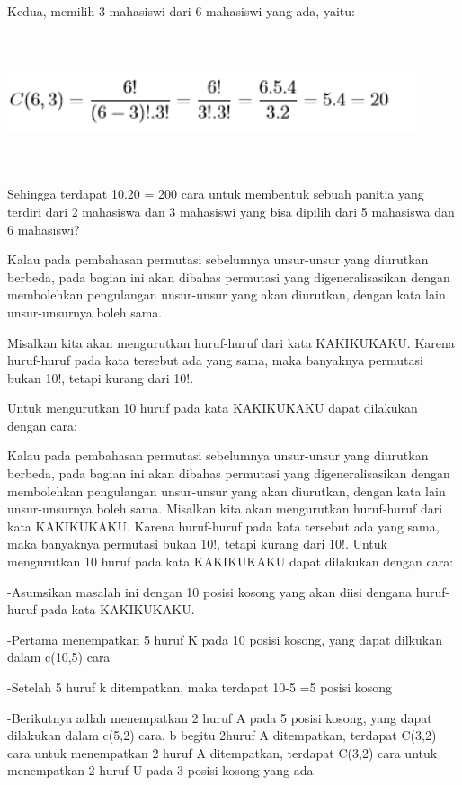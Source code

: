 \documentclass[11pt,fleqn]{book} %
\begin{document}
Kedua, memilih 3 mahasiswi dari 6 mahasiswi yang ada, yaitu:


\includegraphics[width = 12cm, height= 4cm]{Pictures/herlin11.png}

Sehingga terdapat 10.20 = 200 cara untuk membentuk sebuah panitia yang terdiri dari 2 mahasiswa dan 3 mahasiswi yang bisa dipilih dari 5 mahasiswa dan 6 mahasiswi?

Kalau pada pembahasan permutasi sebelumnya unsur-unsur yang diurutkan berbeda, pada bagian ini akan dibahas permutasi yang digeneralisasikan dengan membolehkan pengulangan unsur-unsur yang akan diurutkan, dengan kata lain unsur-unsurnya boleh sama.



Misalkan kita akan mengurutkan huruf-huruf dari kata KAKIKUKAKU. Karena huruf-huruf pada kata tersebut ada yang sama, maka banyaknya permutasi bukan 10!, tetapi kurang dari 10!.


Untuk mengurutkan 10 huruf pada kata KAKIKUKAKU dapat dilakukan dengan cara:

Kalau pada pembahasan permutasi sebelumnya unsur-unsur yang diurutkan berbeda, pada bagian ini akan dibahas permutasi yang digeneralisasikan dengan membolehkan pengulangan unsur-unsur yang akan diurutkan, dengan kata lain unsur-unsurnya boleh sama.
Misalkan kita akan mengurutkan huruf-huruf dari kata KAKIKUKAKU. Karena huruf-huruf pada kata tersebut ada yang sama, maka banyaknya permutasi bukan 10!, tetapi kurang dari 10!.
Untuk mengurutkan 10 huruf pada kata KAKIKUKAKU dapat dilakukan dengan cara:

-Asumsikan masalah ini dengan 10 posisi kosong yang akan diisi dengana huruf-huruf pada kata KAKIKUKAKU.

-Pertama menempatkan 5 huruf K pada 10 posisi kosong, yang dapat dilkukan dalam c(10,5) cara

-Setelah 5 huruf k ditempatkan, maka terdapat 10-5 =5 posisi kosong

-Berikutnya adlah menempatkan 2 huruf A pada 5 posisi kosong, yang dapat dilakukan dalam c(5,2) cara. b begitu 2huruf A ditempatkan, terdapat C(3,2) cara untuk menempatkan 2 huruf A ditempatkan, terdapat C(3,2) cara untuk menempatkan 2 huruf U pada 3 posisi kosong yang ada
\end{document}
